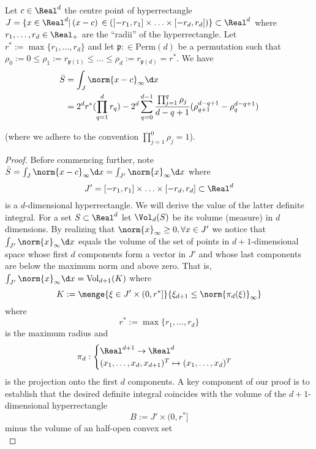 \begin{lem} \label{lem:defint_of_maxnorm}
Let $c \in \Real^d$ the centre point of hyperrectangle $J = \{ x \in \Real^d \vert \,(x-c)\, \in ([-r_1,r_1] \times \ldots \times [-r_d,r_d])\}\subset \Real^d$ where $r_1,\ldots,r_d \in \Real_+$ are the ``radii'' of the hyperrectangle. Let $r^* := \max\{r_1,\ldots,r_d \}$ and let $\mathfrak p: \in \text{Perm}(d)$ be a permutation such that $\rho_0 := 0 \leq \rho_1 := r_{\mathfrak p(1)}\leq \ldots \leq \rho_d := r_{\mathfrak p(d)} =r^*$.
We have 
\begin{align}
\bar S  &= \int_{J} \norm{x-c}_\infty \d x \\
& =  2^d r^* (\prod_{q=1}^d r_q) - 2^d \sum_{q=0}^{d-1} \frac{\prod_{j=1}^{q} \rho_j }{d-q+1} (\rho_{q+1}^{d-q+1} - \rho_{q}^{d-q+1} )
\end{align}

(where we adhere to the convention $\prod_{j=1}^0 \rho_j = 1$).


\begin{proof}
Before commencing further, note $\bar S = \int_{J} \norm{x-c}_\infty \d x = \int_{J'} \norm{x}_\infty \d x$ where 
\[J' =[-r_1,r_1] \times \ldots \times [-r_d,r_d] \subset \Real^d \]
 is a $d$-dimensional hyperrectangle. We will derive the value of the latter definite integral. For a set $S \subset \Real^d$ let $\Vol_{d}(S)$ be its volume (measure) in $d$ dimensions. By realizing that $\norm{x}_\infty \geq 0,\forall x \in J'$ we notice that $\int_{J'} \norm{x}_\infty \d x$ equals the volume of the set of points in $d+1$-dimensional space whose first $d$ components form a vector in $J'$ and whose last components are below the maximum norm and above zero. That is, $\int_{J'} \norm{x}_\infty \d x = \text{Vol}_{d+1}(K)$ where 
\[K :=\menge{\xi \in J' \times (0,r^*]}{ \xi_{d+1} \leq \norm{ \pi_{d}(\xi)}_{\infty}} 
 \] 
 where \[r^* := \max\{r_1,\ldots,r_d \}\] is the maximum radius 
 and \[\pi_d: \begin{cases} \Real^{d+1} \to \Real^d\\ (x_1,\ldots,x_d,x_{d+1})^T \mapsto (x_1,\ldots,x_d)^T 
 \end{cases}  \] is the projection onto the first $d$ components.
A key component of our proof is to establish that the desired definite integral coincides with the volume of the $d+1$-dimensional hyperrectangle 
%
\[B:= J' \times (0,r^*] \]  minus the volume of an half-open convex set \\
%


\end{proof}
\end{lem}
